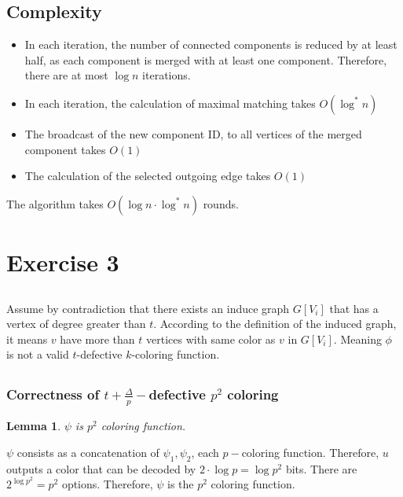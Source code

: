 \documentclass[11pt]{article}
\newtheorem{lemma}[theorem]{Lemma}
\begin{document}
\subsection*{Complexity}
\begin{itemize}
    \item In each iteration, the number of connected components is reduced by at least half, as each component is merged with at least one component. Therefore, there are at most $\log{n}$ iterations.
    \item In each iteration, the calculation of maximal matching takes $O(\log^{*}{n})$
    \item The broadcast of the new component ID, to all vertices of the merged component takes $O(1)$
    \item The calculation of the selected outgoing edge takes $O(1)$
\end{itemize}
The algorithm takes $O(\log{n} \cdot \log^{*}{n})$ rounds.

\section{Exercise 3}

\subsection{}
Assume by contradiction that there exists an induce graph $G[V_i]$ that has a vertex of degree greater than $t$. According to the definition of the induced graph, it means $v$ have more than $t$ vertices with same color as $v$ in $G[V_i]$. Meaning $\phi$ is not a valid $t$-defective $k$-coloring function.

\subsection{}

\subsubsection*{Correctness of $t + \frac{\Delta}{p}-$defective $p^2$ coloring}

\begin{lemma}
\label{psi_p2_coloring}
$\psi$ is $p^2$ coloring function.
\end{lemma}
$\psi$ consists as a concatenation of $\psi_1, \psi_2$, each $p-$coloring function. Therefore, $u$ outputs a color that can be decoded by $2 \cdot \log{p}=\log{p^2}$ bits. There are $2^{\log{p^2}}=p^2$ options. Therefore, $\psi$ is the $p^2$ coloring function. 
\end{document}
